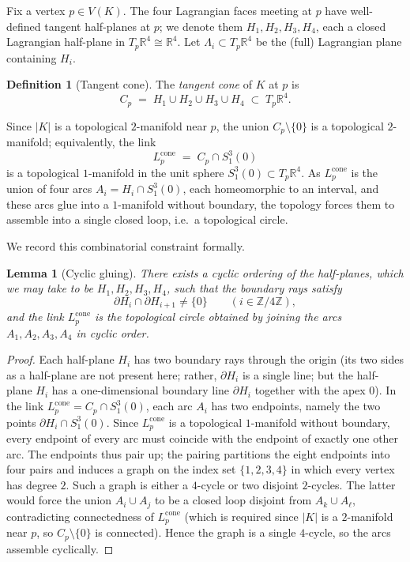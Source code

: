 \documentclass[12pt]{article}
\newtheorem{lemma}[theorem]{Lemma}
\theoremstyle{definition}
\newtheorem{definition}[theorem]{Definition}
\begin{document}
Fix a vertex $p\in V(K)$. The four Lagrangian faces meeting at $p$ have well-defined tangent half-planes at $p$; we denote them $H_1,H_2,H_3,H_4$, each a closed Lagrangian half-plane in $T_p\mathbb{R}^4\cong\mathbb{R}^4$. Let $\Lambda_i\subset T_p\mathbb{R}^4$ be the (full) Lagrangian plane containing $H_i$.

\begin{definition}[Tangent cone]\label{def:cone}
The \emph{tangent cone} of $K$ at $p$ is
\begin{equation}\label{eq:cone}
C_p \;=\; H_1\cup H_2\cup H_3\cup H_4 \;\subset\; T_p\mathbb{R}^4.
\end{equation}
\end{definition}

Since $|K|$ is a topological $2$-manifold near $p$, the union $C_p\setminus\{0\}$ is a topological $2$-manifold; equivalently, the link
\[
L_p^{\mathrm{cone}} \;=\; C_p \cap S^3_1(0)
\]
is a topological $1$-manifold in the unit sphere $S^3_1(0)\subset T_p\mathbb{R}^4$. As $L_p^{\mathrm{cone}}$ is the union of four arcs $A_i = H_i\cap S^3_1(0)$, each homeomorphic to an interval, and these arcs glue into a $1$-manifold without boundary, the topology forces them to assemble into a single closed loop, i.e.\ a topological circle.

We record this combinatorial constraint formally.

\begin{lemma}[Cyclic gluing]\label{lem:cyclic}
There exists a cyclic ordering of the half-planes, which we may take to be $H_1,H_2,H_3,H_4$, such that the boundary rays satisfy
\begin{equation}\label{eq:cyclic}
\partial H_i \cap \partial H_{i+1} \neq \{0\} \qquad (i\in\mathbb{Z}/4\mathbb{Z}),
\end{equation}
and the link $L_p^{\mathrm{cone}}$ is the topological circle obtained by joining the arcs $A_1,A_2,A_3,A_4$ in cyclic order.
\end{lemma}

\begin{proof}
Each half-plane $H_i$ has two boundary rays through the origin (its two sides as a half-plane are not present here; rather, $\partial H_i$ is a single line; but the half-plane $H_i$ has a one-dimensional boundary line $\partial H_i$ together with the apex $0$). In the link $L_p^{\mathrm{cone}}=C_p\cap S^3_1(0)$, each arc $A_i$ has two endpoints, namely the two points $\partial H_i\cap S^3_1(0)$. Since $L_p^{\mathrm{cone}}$ is a topological $1$-manifold without boundary, every endpoint of every arc must coincide with the endpoint of exactly one other arc. The endpoints thus pair up; the pairing partitions the eight endpoints into four pairs and induces a graph on the index set $\{1,2,3,4\}$ in which every vertex has degree $2$. Such a graph is either a $4$-cycle or two disjoint $2$-cycles. The latter would force the union $A_i\cup A_j$ to be a closed loop disjoint from $A_k\cup A_\ell$, contradicting connectedness of $L_p^{\mathrm{cone}}$ (which is required since $|K|$ is a $2$-manifold near $p$, so $C_p\setminus\{0\}$ is connected). Hence the graph is a single $4$-cycle, so the arcs assemble cyclically.
\end{proof}
\end{document}
